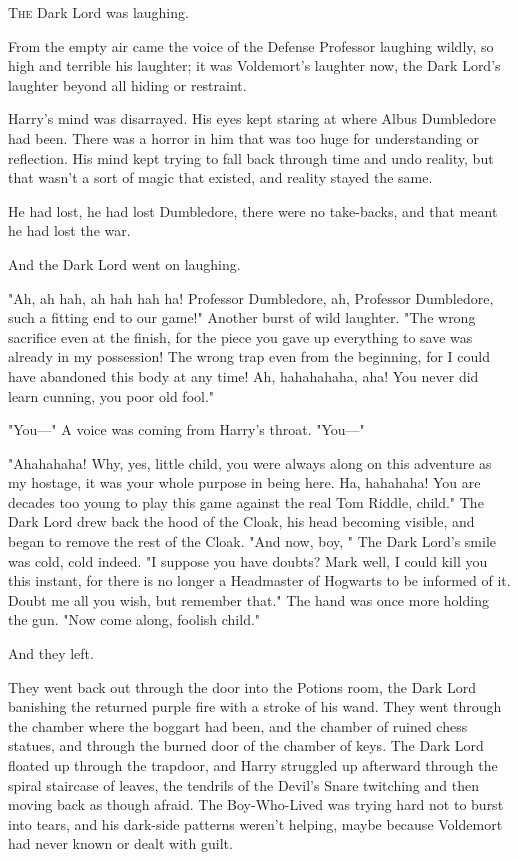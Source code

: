 
\lettrine{T}{he} Dark Lord was laughing.

From the empty air came the voice of the Defense Professor laughing wildly, so
high and terrible his laughter; it was Voldemort's laughter now, the Dark
Lord's laughter beyond all hiding or restraint.

Harry's mind was disarrayed. His eyes kept staring at where Albus Dumbledore
had been. There was a horror in him that was too huge for understanding or
reflection. His mind kept trying to fall back through time and undo reality,
but that wasn't a sort of magic that existed, and reality stayed the same.

He had lost, he had lost Dumbledore, there were no take-backs, and that meant
he had lost the war.

And the Dark Lord went on laughing.

"Ah, ah hah, ah hah hah ha! Professor Dumbledore, ah, Professor Dumbledore,
such a fitting end to our game!" Another burst of wild laughter. "The wrong
sacrifice even at the finish, for the piece you gave up everything to save was
already in my possession! The wrong trap even from the beginning, for I could
have abandoned this body at any time! Ah, hahahahaha, aha! You never did learn
cunning, you poor old fool."

"You\mbox{---}" A voice was coming from Harry's throat. "You\mbox{---}"

"Ahahahaha! Why, yes, little child, you were always along on this adventure as
my hostage, it was your whole purpose in being here. Ha, hahahaha! You are
decades too young to play this game against the real Tom Riddle, child." The
Dark Lord drew back the hood of the Cloak, his head becoming visible, and began
to remove the rest of the Cloak. "And now, boy, " The Dark Lord's smile was cold, cold indeed. "I suppose you have
doubts? Mark well, I could kill you this instant, for there is no longer a
Headmaster of Hogwarts to be informed of it. Doubt me all you wish, but
remember that." The hand was once more holding the gun. "Now come along,
foolish child."

And they left.

They went back out through the door into the Potions room, the Dark Lord
banishing the returned purple fire with a stroke of his wand. They went through
the chamber where the boggart had been, and the chamber of ruined chess
statues, and through the burned door of the chamber of keys. The Dark Lord
floated up through the trapdoor, and Harry struggled up afterward through the
spiral staircase of leaves, the tendrils of the Devil's Snare twitching and
then moving back as though afraid. The Boy-Who-Lived was trying hard not to
burst into tears, and his dark-side patterns weren't helping, maybe because
Voldemort had never known or dealt with guilt.

